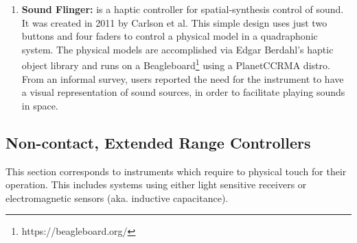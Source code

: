\begin{enumerate}
    \item \textbf{Sound Flinger:} is a haptic controller for spatial-synthesis control of sound. It was created in 2011 by Carlson et al. This simple design uses just two buttons and four faders to control a physical model in a quadraphonic system. The physical models are accomplished via Edgar Berdahl’s haptic object library \cite{berdahl2010hsp} and runs on a Beagleboard\footnote{https://beagleboard.org/} using a PlanetCCRMA distro\cite{lopez2005surviving}. From an informal survey, users reported the need for the instrument to have a visual representation of sound sources, in order to facilitate playing sounds in space.
    
\end{enumerate}

\subsection{Non-contact, Extended Range Controllers} %

This section corresponds to instruments which require to physical touch for their operation. This includes systems using either light sensitive receivers or electromagnetic sensors (aka. inductive capacitance). 

